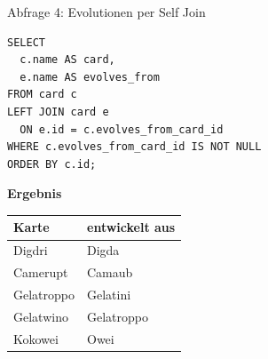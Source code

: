\documentclass[aspectratio=169,11pt]{beamer}
\begin{document}
\begin{frame}[fragile]{Abfrage 4: Evolutionen per Self Join}
  \begin{minipage}[t]{0.50\textwidth}
    \begin{panel}
\begin{lstlisting}
SELECT
  c.name AS card,
  e.name AS evolves_from
FROM card c
LEFT JOIN card e
  ON e.id = c.evolves_from_card_id
WHERE c.evolves_from_card_id IS NOT NULL
ORDER BY c.id;
\end{lstlisting}
    \end{panel}
  \end{minipage}\hfill
  \begin{minipage}[t]{0.46\textwidth}
    \begin{panel}[colback=softblue,colframe=blue!35]
      {\bfseries Ergebnis}\par
      \vspace{0.2em}
      \begin{tabularx}{\linewidth}{@{}YY@{}}
        \toprule
        Karte & entwickelt aus \\
        \midrule
        Digdri & Digda \\
        Camerupt & Camaub \\
        Gelatroppo & Gelatini \\
        Gelatwino & Gelatroppo \\
        Kokowei & Owei \\
        \bottomrule
      \end{tabularx}
    \end{panel}
  \end{minipage}
\end{frame}
\end{document}
